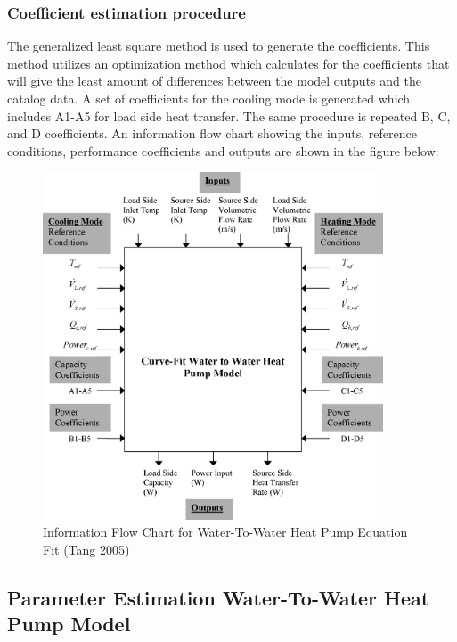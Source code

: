 \subsubsection{Coefficient estimation procedure}\label{coefficient-estimation-procedure-1}

The generalized least square method is used to generate the coefficients. This method utilizes an optimization method which calculates for the coefficients that will give the least amount of differences between the model outputs and the catalog data. A set of coefficients for the cooling mode is generated which includes A1-A5 for load side heat transfer. The same procedure is repeated B, C, and D coefficients. An information flow chart showing the inputs, reference conditions, performance coefficients and outputs are shown in the figure below:

\begin{figure}[hbtp] %
\centering
\includegraphics[width=0.9\textwidth, height=0.9\textheight, keepaspectratio=true]{media/image5290.png}
\caption{Information Flow Chart for Water-To-Water Heat Pump Equation Fit (Tang 2005) \protect \label{fig:information-flow-chart-for-water-to-water}}
\end{figure}

\subsection{Parameter Estimation Water-To-Water Heat Pump Model}\label{parameter-estimation-water-to-water-heat-pump-model}

